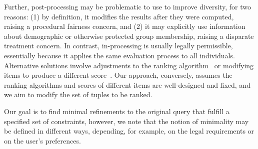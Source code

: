Further, post-processing may be problematic to use to improve diversity, for two reasons: (1) by definition, it modifies the results after they were computed, raising a procedural fairness concern, and (2) it may explicitly use information about demographic or otherwise protected group membership, raising a disparate treatment concern. In contrast, in-processing %
is usually legally permissible, essentially because it applies the same evaluation process to all individuals. 
Alternative  solutions involve adjustments to the ranking algorithm~\cite{AJS19} or modifying items to produce a different score~\cite{KR18, CMV20}. Our approach, conversely, assumes the ranking algorithms and scores of different items are well-designed and fixed, and we aim to modify the set of tuples to be ranked.

 Our goal is to find minimal refinements to the original query that fulfill a specified set of constraints, however, we note that the notion of minimality may be defined in different ways, depending, for example, on the legal requirements or on the user's preferences.

